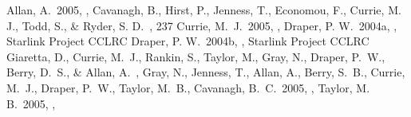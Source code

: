\documentclass[11pt,twoside]{article}  %
\begin{document}
\begin{references}

 Allan, A.\ 2005, \adassxiv, 
 Cavanagh, B., Hirst, P., Jenness, T., Economou, F., Currie, M. J.,
Todd, S., \& Ryder, S.  D.\ \adassxii, 237
 Currie, M.\ J.\ 2005, \adassxiv, 
 Draper, P. W.\  2004a, 
,
Starlink Project CCLRC
 Draper, P. W.\  2004b,
,
Starlink Project CCLRC
 Giaretta, D., Currie, M.\ J., Rankin, S., Taylor, M., Gray, N.,
Draper, P.\ W., Berry, D.\ S., \& Allan, A.\ \adassxiv, 
 Gray, N., Jenness, T., Allan, A., Berry, S.\ B., Currie, M.\ J.,
Draper, P.\ W., Taylor, M.\ B., Cavanagh, B.\ C.\ 2005, \adassxiv, 
 Taylor, M. B.\ 2005, \adassxiv, 


\end{references}

\end{document}

